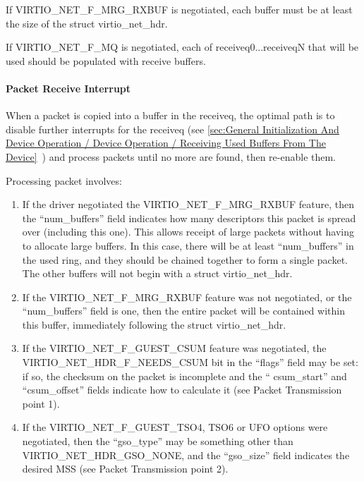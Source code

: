 If VIRTIO_NET_F_MRG_RXBUF is negotiated, each buffer must be at
least the size of the struct virtio_net_hdr.

If VIRTIO_NET_F_MQ is negotiated, each of receiveq0...receiveqN
that will be used should be populated with receive buffers.

\paragraph{Packet Receive Interrupt}\label{sec:Device Types / Network Device / Device Operation / Setting Up Receive Buffers / Packet Receive Interrupt}

When a packet is copied into a buffer in the receiveq, the
optimal path is to disable further interrupts for the receiveq
(see \ref{sec:General Initialization And Device Operation / Device Operation / Receiving Used Buffers From The Device}~) and process
packets until no more are found, then re-enable them.

Processing packet involves:

\begin{enumerate}
\item If the driver negotiated the VIRTIO_NET_F_MRG_RXBUF feature,
  then the “num_buffers” field indicates how many descriptors
  this packet is spread over (including this one). This allows
  receipt of large packets without having to allocate large
  buffers. In this case, there will be at least “num_buffers” in
  the used ring, and they should be chained together to form a
  single packet. The other buffers will not begin with a struct
  virtio_net_hdr.

\item If the VIRTIO_NET_F_MRG_RXBUF feature was not negotiated, or
  the “num_buffers” field is one, then the entire packet will be
  contained within this buffer, immediately following the struct
  virtio_net_hdr.

\item If the VIRTIO_NET_F_GUEST_CSUM feature was negotiated, the
  VIRTIO_NET_HDR_F_NEEDS_CSUM bit in the “flags” field may be
  set: if so, the checksum on the packet is incomplete and the “
  csum_start” and “csum_offset” fields indicate how to calculate
  it (see Packet Transmission point 1).

\item If the VIRTIO_NET_F_GUEST_TSO4, TSO6 or UFO options were
  negotiated, then the “gso_type” may be something other than
  VIRTIO_NET_HDR_GSO_NONE, and the “gso_size” field indicates the
  desired MSS (see Packet Transmission point 2).
\end{enumerate}

